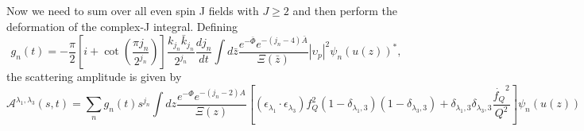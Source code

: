 \documentclass[10 pt]{article}
\begin{document}
Now we need to sum over all even spin J fields with $J \geqslant 2$ and then perform the deformation of the complex-J integral.
Defining
\begin{equation}
g_n\left(t\right) = - \frac{\pi}{2} \left[i + \cot\left(\frac{\pi j_n}{2^{j_n}}\right)\right] \frac{k_{j_n} \bar{k}_{j_n}}{2^{j_n}} \frac{d j_n}{dt} \int d\bar{z} \frac{e^{-\bar{\Phi}}e^{-\left(j_n-4\right)\bar{A}}}{\Xi\left(\bar{z}\right)} |\upsilon_p|^2  {\psi_n\left(u\left(z\right)\right)}^*,
\end{equation}
the scattering amplitude is given by
\begin{equation}
\mathcal{A}^{\lambda_1, \lambda_3} \left(s, t\right) = \sum_n g_n\left(t\right) s^{j_n} \int dz \frac{e^{-\Phi} e^{-\left(j_n-2\right)A}}{\Xi\left(z\right)} \left[ \left( \epsilon_{\lambda_1} \cdot \epsilon_{\lambda_3}\right) f_Q^2 \left(1-\delta_{\lambda_1,3}\right) \left(1-\delta_{\lambda_3,3}\right) + \delta_{\lambda_1,3} \delta_{\lambda_3, 3} \frac{\dot{f_Q}^2}{Q^2}\right] \psi_n \left(u\left(z\right)\right)
\end{equation}
\end{document}
